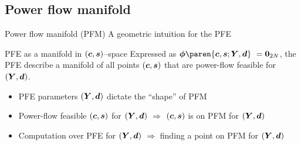 \subsection{Power flow manifold}

\begin{frame}[t]{Power flow manifold (PFM)}{%
    A geometric intuition for the PFE}

    \begin{block}{PFE as a manifold in \(\left(\boldsymbol{c},\boldsymbol{s}\right)\)--space}
        Expressed as
        {\color{CornellRed}
        \(\Resids\paren{\SupInjs,\BusVolts;\Ybus,\DemDrws} \ = \ZerosVec[2\NumBuses]\)},
        the PFE describe a manifold of all points \(\left(\boldsymbol{c},\boldsymbol{s}\right)\)
        that are power-flow feasible for \(\left(\boldsymbol{Y},\boldsymbol{d}\right)\).
    \end{block}

    \begin{itemize}
        \item PFE parameters \(\left(\boldsymbol{Y},\boldsymbol{d}\right)\)
            dictate the \textcolor<2>{CornellRed}{``shape'' of PFM}

        \item Power-flow feasible \(\left(\boldsymbol{c},\boldsymbol{s}\right)\)
            for \(\left(\boldsymbol{Y},\boldsymbol{d}\right)\)
            \(\Longrightarrow\)
            \textcolor<3>{CornellRed}{\(\left(\boldsymbol{c},\boldsymbol{s}\right)\)
            is on PFM for \(\left(\boldsymbol{Y},\boldsymbol{d}\right)\)}

        \item Computation over PFE for \(\left(\boldsymbol{Y},\boldsymbol{d}\right)\)
            \(\Longrightarrow\)
            \textcolor<3>{CornellRed}{finding a point on PFM for \(\left(\boldsymbol{Y},\boldsymbol{d}\right)\)}
    \end{itemize}

    \vspace{5em}
\end{frame}
